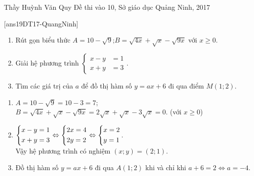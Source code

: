 \begin{name}
{Thầy  Huỳnh Văn Quy}
{Đề thi vào 10, Sở giáo dục Quảng Ninh, 2017}
\end{name}
\setcounter{ex}{0}
[ans19DT17-QuangNinh]
\begin{ex}%
    \hfill
    \begin{enumerate}
        \item Rút gọn biểu thức $A=10-\sqrt{9}$;\quad $B=\sqrt{4x}+\sqrt{x}-\sqrt{9x}$ với $x\geq0$.
        \item Giải hệ phương trình $\begin{cases}
        x-y&=1\\
        x+y&=3
        \end{cases}$.
        \item Tìm các giá trị của $a$ để đồ thị hàm số $y=ax+6$ đi qua điểm $M(1;2)$.
    \end{enumerate}
\loigiai
    {
    \begin{enumerate}
        \item $A=10-\sqrt{9}=10-3=7$;\\
        $B=\sqrt{4x}+\sqrt{x}-\sqrt{9x}        =2\sqrt{x}+\sqrt{x}-3\sqrt{x}=0$. (với $x\geq0$)
        \item $\left\{\begin{aligned}&x-y=1\\&x+y=3\end{aligned}\right.\Leftrightarrow \left\{\begin{aligned}& 2x=4\\ &2y=2\end{aligned}\right.\Leftrightarrow\left\{\begin{aligned}& x=2\\ & y=1\end{aligned}\right.$.\\
        Vậy hệ phương trình có nghiệm $(x;y)=(2;1)$.
        \item Đồ thị hàm số $y=ax+6$ đi qua $A(1;2)$ khi và chỉ khi $a+6=2\Leftrightarrow a=-4$.
    \end{enumerate}
    }
\end{ex}

